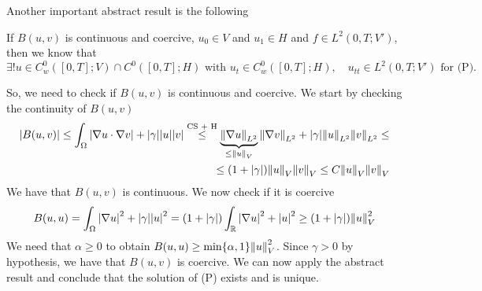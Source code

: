 Another important abstract result is the following
\begin{remark}
    If \(B(u, v)\) is continuous and coercive, \(u_0 \in V\) and \(u_1 \in H\) and \(f \in L^2(0, T; V')\), then we know that 
    \[
        \exists! u \in C_w^0([0, T]; V) \cap C^0([0, T]; H) \text{ with } u_t \in C_w^0([0, T]; H), \quad u_{tt} \in L^2(0, T; V') \text{ for (P).}
    \]
\end{remark}
So, we need to check if \(B(u, v)\) is continuous and coercive. We start by checking the continuity of \(B(u, v)\)
\[
    \begin{split}
        \abs{B(u, v)} \leq \int_\Omega \abs{\nabla u \cdot \nabla v} + \abs{\gamma} \abs{u} \abs{v} \overset{\text{CS + H}}{\leq} \underbrace{\norm{\nabla u}_{L^2}}_{\leq \norm{u}_V} \norm{\nabla v}_{L^2} + \abs{\gamma} \norm{u}_{L^2} \norm{v}_{L^2} \leq \\ 
        \leq (1 + \abs{\gamma}) \norm{u}_V \norm{v}_V \leq C \norm{u}_V \norm{v}_V
    \end{split}
\]
We have that \(B(u, v)\) is continuous. We now check if it is coercive
\[
    \begin{split}
        B(u, u) = \int_\Omega \abs{\nabla u}^2 + \abs{\gamma} \abs{u}^2 = (1 + \abs{\gamma}) \int_{\mathbb{R}} \abs{\nabla u}^2  + \abs{u}^2 \geq (1 + \abs{\gamma}) \norm{u}_V^2
    \end{split}
\]
We need that \(\alpha \geq 0\) to obtain \(B(u,u) \geq \min\{\alpha, 1\} \norm{u}_V^2\). Since \(\gamma > 0\) by hypothesis, we have that \(B(u, v)\) is coercive. We can now apply the abstract result and conclude that the solution of (P) exists and is unique.

